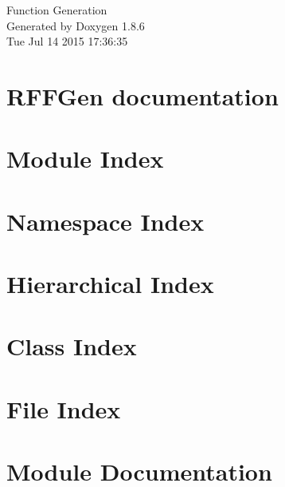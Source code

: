 \documentclass[twoside]{book}
\newcommand{\clearemptydoublepage}{%
  \newpage{\pagestyle{empty}\cleardoublepage}%
}
\begin{document}
\hypersetup{pageanchor=false}
\begin{titlepage}
\vspace*{7cm}
\begin{center}%
{\Large Function Generation }\\
\vspace*{1cm}
{\large Generated by Doxygen 1.8.6}\\
\vspace*{0.5cm}
{\small Tue Jul 14 2015 17:36:35}\\
\end{center}
\end{titlepage}
\clearemptydoublepage
\tableofcontents
\clearemptydoublepage
{}
\hypersetup{pageanchor=true}

\chapter{R\-F\-F\-Gen documentation}
\label{index}\hypertarget{index}{}
\chapter{Module Index}

\chapter{Namespace Index}

\chapter{Hierarchical Index}

\chapter{Class Index}

\chapter{File Index}

\chapter{Module Documentation}













\end{document}

